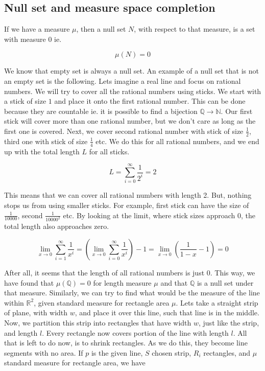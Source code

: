 \documentclass{article}
\begin{document}
\subsection{Null set and measure space completion}
If we have a measure $\mu$, then a null set $N$, with respect to that measure, is a set with measure 0 ie.

\[ \mu(N) = 0 \]

We know that empty set is always a null set. An example of a null set that is not an empty set is the following. Lets imagine a real line and focus on rational numbers. We will try to cover all the rational numbers using sticks. We start with a stick of size $1$ and place it onto the first rational number. This can be done because they are countable ie. it is possible to find a bijection $\mathbb{Q}\to\mathbb{N}$. Our first stick will cover more than one rational number, but we don't care as long as the first one is covered. Next, we cover second rational number with stick of size $\frac{1}{2}$, third one with stick of size $\frac{1}{4}$ etc. We do this for all rational numbers, and we end up with the total length $L$ for all sticks.

\[ L=\sum_{i=0}^{\infty}\frac{1}{2^i}=2\]

This means that we can cover all rational numbers with length 2. But, nothing stops us from using smaller sticks. For example, first stick can have the size of $\frac{1}{10000}$, second $\frac{1}{10000^2}$ etc. By looking at the limit, where stick sizes approach 0, the total length also approaches zero.

\[ \lim_{x \to 0}\sum_{i=1}^{\infty}\frac{1}{x^i}=(\lim_{x \to 0}\sum_{i=0}^{\infty}\frac{1}{x^i})-1=\lim_{x \to 0} (\frac{1}{1-x} - 1)=0 \]

After all, it seems that the length of all rational numbers is just 0. This way, we have found that $\mu(\mathbb{Q})=0$ for length measure $\mu$ and that $\mathbb{Q}$ is a null set under that measure.
\newline\indent Similarly, we can try to find what would be the measure of the line within $\mathbb{R}^2$, given standard measure for rectangle area $\mu$. Lets take a straight strip of plane, with width $w$, and place it over this line, such that line is in the middle. Now, we partition this strip into rectangles that have width $w$, just like the strip, and length $l$. Every rectangle now covers portion of the line with length $l$. All that is left to do now, is to shrink rectangles. As we do this, they become line segments with no area. If $p$ is the given line, $S$ chosen strip, $R_i$ rectangles, and $\mu$ standard measure for rectangle area, we have
\end{document}

